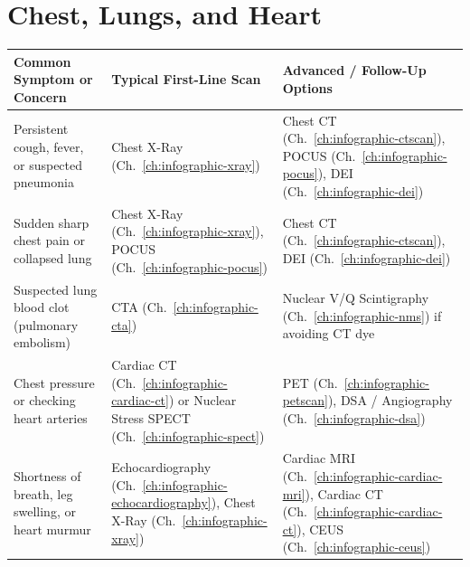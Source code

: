 \section{Chest, Lungs, and Heart}
{\renewcommand{\arraystretch}{1.25}\noindent
\begin{tabularx}{\textwidth}{@{}p{} p{} X@{}}
\toprule
\textbf{Common Symptom or Concern} & \textbf{Typical First-Line Scan} & \textbf{Advanced / Follow-Up Options} \\
\midrule
Persistent cough, fever, or suspected pneumonia & Chest X-Ray (Ch.~\ref{ch:infographic-xray}) & Chest CT (Ch.~\ref{ch:infographic-ctscan}), POCUS (Ch.~\ref{ch:infographic-pocus}), DEI (Ch.~\ref{ch:infographic-dei}) \\
Sudden sharp chest pain or collapsed lung & Chest X-Ray (Ch.~\ref{ch:infographic-xray}), POCUS (Ch.~\ref{ch:infographic-pocus}) & Chest CT (Ch.~\ref{ch:infographic-ctscan}), DEI (Ch.~\ref{ch:infographic-dei}) \\
Suspected lung blood clot (pulmonary embolism) & CTA (Ch.~\ref{ch:infographic-cta}) & Nuclear V/Q Scintigraphy (Ch.~\ref{ch:infographic-nms}) if avoiding CT dye \\
Chest pressure or checking heart arteries & Cardiac CT (Ch.~\ref{ch:infographic-cardiac-ct}) or Nuclear Stress SPECT (Ch.~\ref{ch:infographic-spect}) & PET (Ch.~\ref{ch:infographic-petscan}), DSA / Angiography (Ch.~\ref{ch:infographic-dsa}) \\
Shortness of breath, leg swelling, or heart murmur & Echocardiography (Ch.~\ref{ch:infographic-echocardiography}), Chest X-Ray (Ch.~\ref{ch:infographic-xray}) & Cardiac MRI (Ch.~\ref{ch:infographic-cardiac-mri}), Cardiac CT (Ch.~\ref{ch:infographic-cardiac-ct}), CEUS (Ch.~\ref{ch:infographic-ceus}) \\
\bottomrule
\end{tabularx}}

